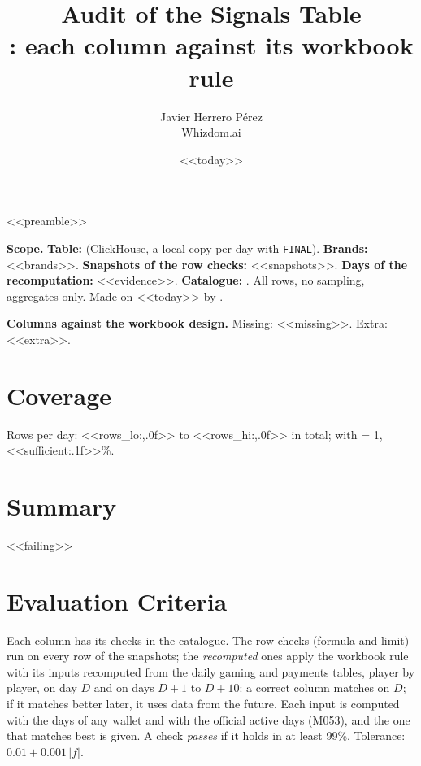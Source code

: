 <<preamble>>
\newcommand{\prioE}{\badge{BrickRed}{ERROR}}
\newcommand{\prioC}{\badge{BurntOrange}{TO CONFIRM}}
\title{\textbf{Audit of the Signals Table}\\[2pt]\large{}: each column against its workbook rule}
\date{<<today>>}
\author{Javier Herrero Pérez \\ Whizdom.ai}


\maketitle
\vspace{-1.2cm}

\textbf{Scope.} \textbf{Table:}  (ClickHouse, a local copy per day with \texttt{FINAL}). \textbf{Brands:} <<brands>>. \textbf{Snapshots of the row checks:} <<snapshots>>. \textbf{Days of the recomputation:} <<evidence>>. \textbf{Catalogue:} . All rows, no sampling, aggregates only. Made on <<today>> by .

\textbf{Columns against the workbook design.} Missing: <<missing>>. Extra: <<extra>>.

\section{Coverage}
Rows per day: <<rows_lo:,.0f>> to <<rows_hi:,.0f>> in total; with  = 1, <<sufficient:.1f>>\%.

\section{Summary}
\begin{center}

\end{center}

<<failing>>

\section{Evaluation Criteria}
Each column has its checks in the catalogue. The row checks (formula and limit) run on every row of the snapshots; the \emph{recomputed} ones apply the workbook rule with its inputs recomputed from the daily gaming and payments tables, player by player, on day $D$ and on days $D+1$ to $D+10$: a correct column matches on $D$; if it matches better later, it uses data from the future. Each input is computed with the days of any wallet and with the official active days (M053), and the one that matches best is given. A check \emph{passes} if it holds in at least 99\%. Tolerance: $0.01 + 0.001\,|f|$.

